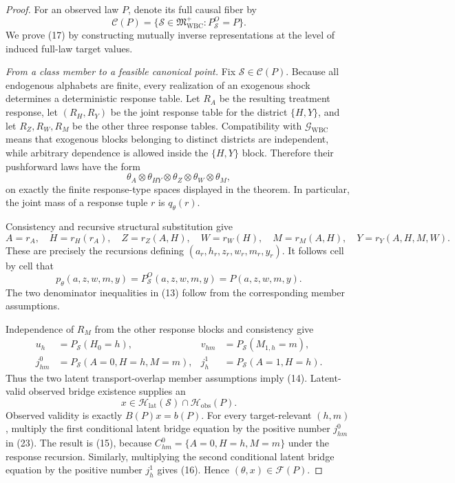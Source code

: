 \documentclass{article}
\begin{document}
\begin{proof}
For an observed law \(P\), denote its full causal fiber by
\[
 \mathcal C(P)=\{\mathcal S\in\mathfrak M_{\mathrm{WBC}}^{+}:
 P_{\mathcal S}^O=P\}.
\]
We prove (17) by constructing mutually inverse representations at the level
of induced full-law target values.

\emph{From a class member to a feasible canonical point.}
Fix \(\mathcal S\in\mathcal C(P)\).  Because all endogenous alphabets are
finite, every realization of an exogenous shock determines a deterministic
response table.  Let \(R_A\) be the resulting treatment response, let
\((R_H,R_Y)\) be the joint response table for the district \(\{H,Y\}\),
and let \(R_Z,R_W,R_M\) be the other three response tables.  Compatibility
with \(\mathcal G_{\mathrm{WBC}}\) means that exogenous blocks belonging to
distinct districts are independent, while arbitrary dependence is allowed
inside the \(\{H,Y\}\) block.  Therefore their pushforward laws have the
form
\[
 \theta_A\otimes\theta_{HY}\otimes\theta_Z\otimes\theta_W
 \otimes\theta_M,
\]
on exactly the finite response-type spaces displayed in the theorem.  In
particular, the joint mass of a response tuple \(r\) is \(q_\theta(r)\).

Consistency and recursive structural substitution give
\[
 A=r_A,\quad H=r_H(r_A),\quad Z=r_Z(A,H),\quad W=r_W(H),\quad
 M=r_M(A,H),\quad Y=r_Y(A,H,M,W).
\]
These are precisely the recursions defining
\((a_r,h_r,z_r,w_r,m_r,y_r)\).  It follows cell by cell that
\[
 p_\theta(a,z,w,m,y)=P_{\mathcal S}^O(a,z,w,m,y)=P(a,z,w,m,y).
 \tag{22}
\]
The two denominator inequalities in (13) follow from the corresponding
member assumptions.

Independence of \(R_M\) from the other response blocks and consistency give
\[
\begin{aligned}
 u_h&=P_{\mathcal S}(H_0=h),&
 v_{hm}&=P_{\mathcal S}(M_{1,h}=m),\\
 j^0_{hm}&=P_{\mathcal S}(A=0,H=h,M=m),&
 j^1_h&=P_{\mathcal S}(A=1,H=h).
\end{aligned}
 \tag{23}
\]
Thus the two latent transport-overlap member assumptions imply (14).
Latent-valid observed bridge existence supplies an
\[
 x\in\mathcal H_{\mathrm{lat}}(\mathcal S)
      \cap\mathcal H_{\mathrm{obs}}(P).
\]
Observed validity is exactly \(B(P)x=b(P)\).  For every target-relevant
\((h,m)\), multiply the first conditional latent bridge equation by the
positive number \(j^0_{hm}\) in (23).  The result is (15), because
\(C^0_{hm}=\{A=0,H=h,M=m\}\) under the response recursion.  Similarly,
multiplying the second conditional latent bridge equation by the positive
number \(j^1_h\) gives (16).  Hence \((\theta,x)\in\mathcal F(P)\).


\end{proof}
\end{document}
